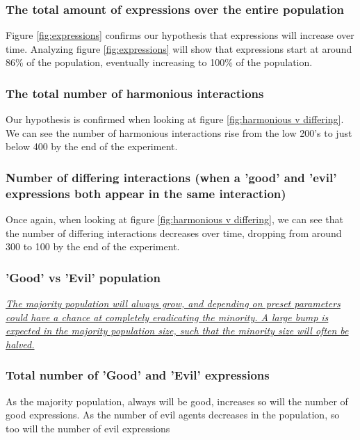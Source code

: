\documentclass[]{article}
\begin{document}
\subsubsection{The total amount of expressions over the entire population} 

Figure \ref{fig:expressions} confirms our hypothesis that expressions will increase over time. Analyzing figure \ref{fig:expressions} will show that expressions start at around 86\% of the population, eventually increasing to 100\% of the population. 


\subsubsection{The total number of harmonious interactions}

Our hypothesis is confirmed when looking at figure \ref{fig:harmonious v differing}. We can see the number of harmonious interactions rise from the low 200's to just below 400 by the end of the experiment.



\subsubsection{Number of differing interactions (when a 'good' and 'evil' expressions both appear in the same interaction)} Once again, when looking at figure \ref{fig:harmonious v differing}, we can see that the number of differing interactions decreases over time, dropping from around 300 to 100 by the end of the experiment. 



\subsubsection{'Good' vs 'Evil' population} \underline{\textit{The majority population will always grow, and depending on preset parameters could have a chance at completely eradicating the minority. A large bump is expected in the majority population size, such that the minority size will often be halved. }}


\subsubsection{Total number of 'Good' and 'Evil' expressions} As the majority population, always will be good, increases so will the number of good expressions. As the number of evil agents decreases in the population, so too will the number of evil expressions
\end{document}
